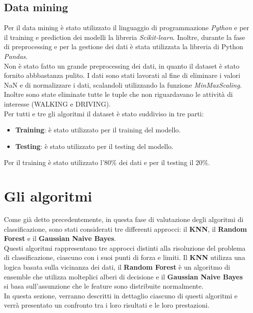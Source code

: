\documentclass[../../Report.tex]{subfiles}
\begin{document}
\subsection{Data mining}
    Per il data mining è stato utilizzato il linguaggio di programmazione \emph{Python} e per il training e prediction dei modelli la libreria \emph{Scikit-learn}. Inoltre, durante la fase di preprocessing e per la gestione dei dati è stata utilizzata la libreria di Python \emph{Pandas}.\\
    Non è stato fatto un grande preprocessing dei dati, in quanto il dataset è stato fornito abbbastanza pulito. I dati sono stati lavorati al fine di eliminare i valori NaN e di normalizzare i dati, scalandoli utilizzando la funzione \emph{MinMaxScaling}. Inoltre sono state eliminate tutte le tuple che non riguardavano le attività di interesse (WALKING e DRIVING).\\
    Per tutti e tre gli algoritmi il dataset è stato suddiviso in tre parti:
    \begin{itemize}
        \item \textbf{Training}: è stato utilizzato per il training del modello.
        \item \textbf{Testing}: è stato utilizzato per il testing del modello.
    \end{itemize}
    Per il training è stato utilizzato l'80\% dei dati e per il testing il 20\%.\\

\section{Gli algoritmi}
Come già detto precedentemente, in questa fase di valutazione degli algoritmi di classificazione, sono stati considerati tre differenti approcci: il \textbf{KNN}, il \textbf{Random Forest} e il \textbf{Gaussian Naive Bayes}.\\
Questi algoritmi rappresentano tre approcci distinti alla risoluzione del problema di classificazione, ciascuno con i suoi punti di forza e limiti. Il \textbf{KNN} utilizza una logica basata sulla vicinanza dei dati, il \textbf{Random Forest} è un algoritmo di ensemble che utilizza molteplici alberi di decisione e il \textbf{Gaussian Naive Bayes} si basa sull'assunzione che le feature sono distribuite normalmente.\\
In questa sezione, verranno descritti in dettaglio ciascuno di questi algoritmi e verrà presentato un confronto tra i loro risultati e le loro prestazioni.
\end{document}
